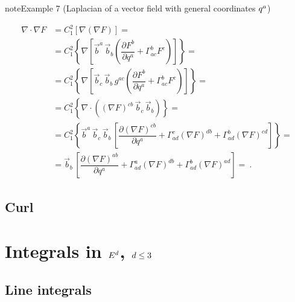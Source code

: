 \documentclass[letterpaper,10pt,english]{jupyterBook}
\begin{document}
\label{ch/tensor-algebra-calculus/calculus-euclidean:example-10}
\begin{sphinxadmonition}{note}{Example 7 (Laplacian of a vector field \sphinxhyphen{} with general coordinates \protect\(q^a\protect\))}


\begin{equation*}
\begin{split}
\nabla \cdot \nabla F
  & = C_{1}^2 \left[ \nabla \left( \nabla F \right) \right] = \\
  & = C_{1}^2 \left\{ \nabla \left[ \vec{b}^a \, \vec{b}_b \left( \dfrac{\partial F^b}{\partial q^a} + \Gamma^{b}_{ac} F^c \right) \right] \right\} = \\
  & = C_{1}^2 \left\{ \nabla \left[ \vec{b}_c \, \vec{b}_b \,  g^{ac} \left( \dfrac{\partial F^b}{\partial q^a} + \Gamma^{b}_{ac} F^c \right) \right] \right\} = \\
  & = C_{1}^2 \left\{ \nabla \cdot \left((\nabla F)^{cb} \, \vec{b}_c \, \vec{b}_b \right) \right\} = \\
  & = C_{1}^2 \left\{ \vec{b}^a \, \vec{b}_c \, \vec{b}_b \, \left[ \dfrac{\partial (\nabla F)^{cb}}{\partial q^a} 
     + \Gamma_{ad}^c (\nabla F)^{db} + \Gamma_{ad}^b (\nabla F)^{cd} \right] \right\} = \\
  & = \vec{b}_b \, \left[ \dfrac{\partial (\nabla F)^{ab}}{\partial q^a} 
     + \Gamma_{ad}^a (\nabla F)^{db} + \Gamma_{ad}^b (\nabla F)^{ad} \right] = \ .
\end{split}
\end{equation*}\end{sphinxadmonition}


\subsection{Curl}
\label{\detokenize{ch/tensor-algebra-calculus/calculus-euclidean:curl}}\label{\detokenize{ch/tensor-algebra-calculus/calculus-euclidean:tensor-calculus-differential-operators-curl}}

\section{Integrals in \protect\(E^d\protect\), \protect\(d \le 3\protect\)}
\label{\detokenize{ch/tensor-algebra-calculus/calculus-euclidean:integrals-in-e-d-d-le-3}}\label{\detokenize{ch/tensor-algebra-calculus/calculus-euclidean:tensor-calculus-integrals}}

\subsection{Line integrals}
\label{\detokenize{ch/tensor-algebra-calculus/calculus-euclidean:line-integrals}}\label{\detokenize{ch/tensor-algebra-calculus/calculus-euclidean:tensor-calculus-integrals-line}}
\end{document}
